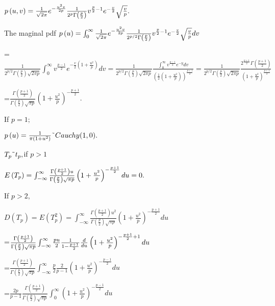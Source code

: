 \documentclass{article}
\begin{document}
$p\left( u,v\right) =\frac{1}{\sqrt{2\pi }}e^{-\frac{u^{2}v}{2p}}\frac{1}{%
2^{p}\Gamma \left( \frac{p}{2}\right) }v^{\frac{p}{2}-1}e^{-\frac{v}{2}}%
\sqrt{\frac{v}{p}}.$

The maginal pdf $p\left( u\right) =\int_{0}^{\infty }\frac{1}{\sqrt{2\pi }}%
e^{-\frac{u^{2}v}{2p}}\frac{1}{2^{p/2}\Gamma \left( \frac{p}{2}\right) }v^{%
\frac{p}{2}-1}e^{-\frac{v}{2}}\sqrt{\frac{v}{p}}dv$

=$\frac{1}{2^{p/2}\Gamma \left( \frac{p}{2}\right) \sqrt{2\pi p}}%
\int_{0}^{\infty }v^{\frac{p-1}{2}}e^{-\frac{v}{2}\left( 1+\frac{u^{2}}{p}%
\right) }dv=\frac{1}{2^{p/2}\Gamma \left( \frac{p}{2}\right) \sqrt{2\pi p}}%
\frac{\int_{0}^{\infty }v^{\frac{p-1}{2}}e^{-y}dv}{\left( \frac{1}{2}\left(
1+\frac{u^{2}}{p}\right) \right) ^{\frac{p+1}{2}}}=\frac{1}{2^{p/2}\Gamma
\left( \frac{p}{2}\right) \sqrt{2\pi p}}\frac{2^{\frac{p+1}{2}}\Gamma \left( 
\frac{p+1}{2}\right) }{\left( 1+\frac{u^{2}}{p}\right) ^{\frac{p+1}{2}}}$

=$\frac{\Gamma \left( \frac{p+1}{2}\right) }{\Gamma \left( \frac{p}{2}%
\right) \sqrt{\pi p}}\left( 1+\frac{u^{2}}{p}\right) ^{-\frac{p+1}{2}}.$

If $p=1;$

$p\left( u\right) =\frac{1}{\pi \left( 1+u^{2}\right) }\symbol{126}%
Cauchy(1,0).$

$T_{p}\symbol{126}t_{p},$if $p>1$

$E\left( T_{p}\right) =\int_{-\infty }^{\infty }\frac{\Gamma \left( \frac{p+1%
}{2}\right) u}{\Gamma \left( \frac{p}{2}\right) \sqrt{\pi p}}\left( 1+\frac{%
u^{2}}{p}\right) ^{-\frac{p+1}{2}}du=0.$

If $p>2,$

$D\left( T_{p}\right) =E\left( T_{p}^{2}\right) =\int_{-\infty }^{\infty }%
\frac{\Gamma \left( \frac{p+1}{2}\right) u^{2}}{\Gamma \left( \frac{p}{2}%
\right) \sqrt{\pi p}}\left( 1+\frac{u^{2}}{p}\right) ^{-\frac{p+1}{2}}du$

=$\frac{\Gamma \left( \frac{p+1}{2}\right) }{\Gamma \left( \frac{p}{2}%
\right) \sqrt{\pi p}}\int_{-\infty }^{\infty }\frac{pu}{2}\frac{1}{1-\frac{%
p+1}{2}}\frac{d}{du}\left( 1+\frac{u^{2}}{p}\right) ^{-\frac{p+1}{2}+1}du$

=$\frac{\Gamma \left( \frac{p+1}{2}\right) }{\Gamma \left( \frac{p}{2}%
\right) \sqrt{\pi p}}\int_{-\infty }^{\infty }\frac{p}{2}\frac{2}{p-1}\left(
1+\frac{u^{2}}{p}\right) ^{-\frac{p-1}{2}}du$

=$\frac{2p}{p-1}\frac{\Gamma \left( \frac{p+1}{2}\right) }{\Gamma \left( 
\frac{p}{2}\right) \sqrt{\pi p}}\int_{0}^{\infty }\left( 1+\frac{u^{2}}{p}%
\right) ^{-\frac{p-1}{2}}du$
\end{document}
